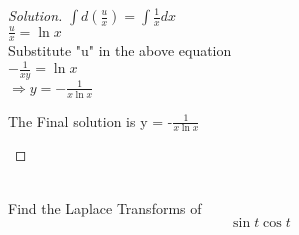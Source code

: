 \documentclass[12pt]{article}
\newenvironment{problem}[2][Problem]{\begin{trivlist}
\item[\hskip \labelsep {\bfseries #1}\hskip \labelsep {\bfseries #2.}]}{\end{trivlist}}
\begin{document}
\begin{proof}[Solution]
$\int d(\frac{u}{x}) = \int \frac{1}{x} dx $ \\

$\frac{u}{x}  = \ln{x} $ \\

Substitute  "u" in the above equation \\

$-\frac{1}{xy} = \ln{x} $ \\

$\Rightarrow y = -\frac{1}{x\ln{x}}$ \\

\begin{Large} The Final solution is  y = -$ \frac{1}{x \ln{x}} $\end{Large}
\end{proof}

\begin{problem}{4}
\text{ }\\
Find the Laplace Transforms of\\
$$\sin{t} \cos{t}$$ 
\end{problem}
 
\end{document}
